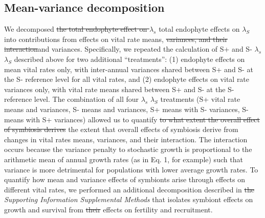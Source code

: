 \documentclass[lineno, sn-basic]{sn-jnl}%
\providecommand{\DIFadd}[1]{{\protect\color{blue}#1}} %
\providecommand{\DIFdel}[1]{{\protect\color{red}\protect\scriptsize\sout{#1}}}
\providecommand{\DIFadd}[1]{{\protect\color{blue}\uwave{#1}}} %
\providecommand{\DIFdel}[1]{{\protect\color{red}\sout{#1}}}                      %
\providecommand{\DIFaddbegin}{} %
\providecommand{\DIFaddend}{} %
\providecommand{\DIFdelbegin}{} %
\providecommand{\DIFdelend}{} %
\newcommand{\DIFscaledelfig}{0.5}
\newlength{\DIFdelgraphicswidth} %
\newlength{\DIFdelgraphicsheight} %
\newcommand{\DIFaddincludegraphics}[2][]{{\color{blue}\fbox{\DIFOincludegraphics[#1]{#2}}}} %
\newcommand{\DIFdelincludegraphics}[2][]{%
\sbox{\DIFdelgraphicsbox}{\DIFOincludegraphics[#1]{#2}}%
\settoboxwidth{\DIFdelgraphicswidth}{\DIFdelgraphicsbox} %
\settoboxtotalheight{\DIFdelgraphicsheight}{\DIFdelgraphicsbox} %
\scalebox{\DIFscaledelfig}{%
\parbox[b]{\DIFdelgraphicswidth}{\usebox{\DIFdelgraphicsbox}\\[-\baselineskip] \rule{\DIFdelgraphicswidth}{0em}}\llap{\resizebox{\DIFdelgraphicswidth}{\DIFdelgraphicsheight}{%
\setlength{\unitlength}{\DIFdelgraphicswidth}%
\begin{picture}(1,1)%
\thicklines\linethickness{2pt} %
{\color[rgb]{1,0,0}\put(0,0){\framebox(1,1){}}}%
{\color[rgb]{1,0,0}\put(0,0){\line( 1,1){1}}}%
{\color[rgb]{1,0,0}\put(0,1){\line(1,-1){1}}}%
\end{picture}%
}\hspace*{3pt}}} %
} %
\DeclareRobustCommand{\DIFaddbegin}{\DIFOaddbegin \let\includegraphics\DIFaddincludegraphics} %
\DeclareRobustCommand{\DIFaddend}{\DIFOaddend \let\includegraphics\DIFOincludegraphics} %
\DeclareRobustCommand{\DIFdelbegin}{\DIFOdelbegin \let\includegraphics\DIFdelincludegraphics} %
\DeclareRobustCommand{\DIFdelend}{\DIFOaddend \let\includegraphics\DIFOincludegraphics} %
\begin{document}
\subsection*{Mean-variance decomposition}
We decomposed \DIFdelbegin \DIFdel{the total endophyte effect on $\lambda_s$ }\DIFdelend \DIFaddbegin \DIFadd{total endophyte effects on $\lambda_S$ }\DIFaddend into contributions from effects on vital rate means, \DIFdelbegin \DIFdel{variances, and their interaction}\DIFdelend \DIFaddbegin \DIFadd{and variances}\DIFaddend . 
Specifically, we repeated the calculation of S+ and S- \DIFdelbegin \DIFdel{$\lambda_s$ }\DIFdelend \DIFaddbegin \DIFadd{$\lambda_S$ }\DIFaddend described above for two additional ``treatments'': (1) endophyte effects on mean vital rates only, with inter-annual variances shared between S+ and S- at the S- reference level for all vital rates, and (2) endophyte effects on vital rate variances only, with vital rate means shared between S+ and S- at the S- reference level. 
The combination of all four \DIFdelbegin \DIFdel{$\lambda_s$ }\DIFdelend \DIFaddbegin \DIFadd{$\lambda_S$ }\DIFaddend treatments (S+ vital rate means and variances, S- means and variances, S+ means with S- variances, S- means with S+ variances) allowed us to quantify \DIFdelbegin \DIFdel{to what extent the overall effect of symbiosis derives }\DIFdelend \DIFaddbegin \DIFadd{the extent that overall effects of symbiosis derive }\DIFaddend from changes in vital rates means, variances, and their interaction. 
The interaction occurs because the variance penalty to stochastic growth is proportional to the arithmetic mean of annual growth rates (as in Eq. 1, for example) such that variance is more detrimental for populations with lower average growth rates. 
To quantify how mean and variance effects of symbionts arise through effects on different vital rates, we performed an additional decomposition described in \DIFdelbegin \DIFdel{the }\DIFdelend \emph{Supporting Information Supplemental Methods} that isolates symbiont effects on growth and survival from \DIFdelbegin \DIFdel{their }\DIFdelend effects on fertility and recruitment.
\end{document}
